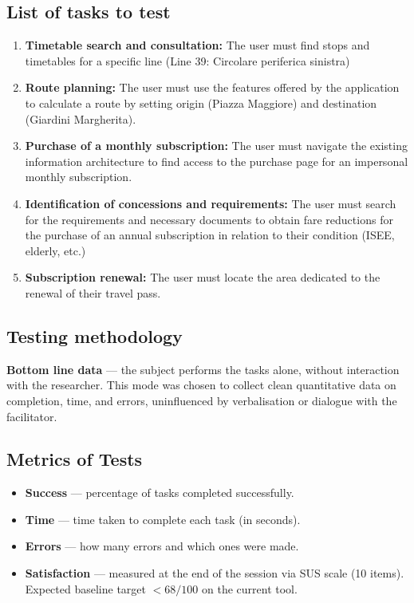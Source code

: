 ﻿\documentclass[11pt,a4paper]{article}
\begin{document}
\subsection*{List of tasks to test}
\begin{tcolorbox}[base]
\begin{enumerate}[leftmargin=*,itemsep=4pt]
  \item \textbf{Timetable search and consultation:} The user must
  find stops and timetables for a specific line (Line 39: Circolare periferica sinistra)
  \item \textbf{Route planning:} The user must use the features offered by the application to calculate a route by setting origin (Piazza Maggiore) and destination (Giardini Margherita).
  \item \textbf{Purchase of a monthly subscription:} The user
  must navigate the existing information architecture to
  find access to the purchase page for an impersonal
  monthly subscription.
  \item \textbf{Identification of concessions and requirements:}
  The user must search for the requirements and necessary documents to obtain fare reductions for the purchase of an
  annual subscription in relation to their condition (ISEE, elderly, etc.)
  \item \textbf{Subscription renewal:} The user
  must locate the area dedicated to the renewal of their travel pass.
\end{enumerate}
\end{tcolorbox}

\vspace{0.2cm}

\subsection*{Testing methodology}
\textbf{Bottom line data} --- the subject
performs the tasks alone, without interaction with the researcher.
This mode was chosen to collect clean
quantitative data on completion, time, and errors,
uninfluenced by verbalisation or dialogue with
the facilitator.

\vspace{0.2cm}

\subsection*{Metrics of Tests}
\begin{itemize}[leftmargin=*,itemsep=3pt]
  \item \textbf{Success} --- percentage of tasks completed
successfully.
  \item \textbf{Time} --- time taken to complete
each task (in seconds).
  \item \textbf{Errors} --- how many errors and which ones were made.
  \item \textbf{Satisfaction} --- measured at the end of the session
via SUS scale (10 items). Expected baseline target
$< 68/100$ on the current tool.
\end{itemize}
\end{document}
